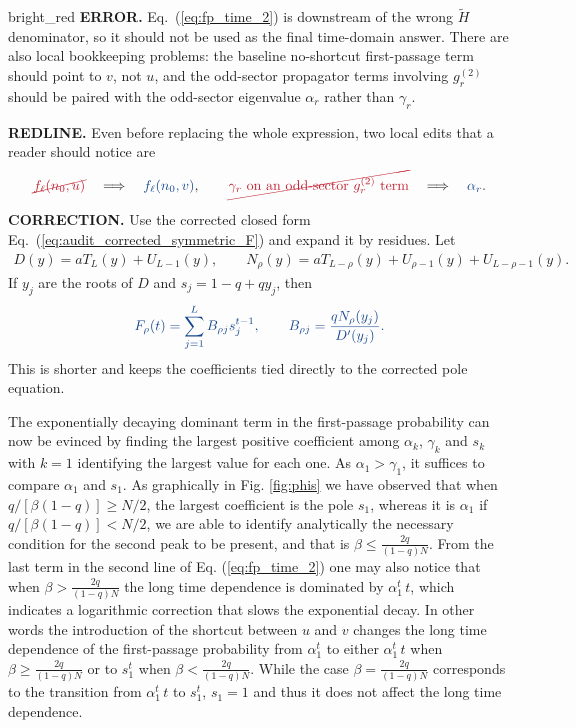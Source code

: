 \documentclass[10pt, hidelinks, superscriptaddress, amsmath, amssymb, aps, pre]{revtex4-2}
\newcommand{\auditlabel}[1]{\textbf{\textcolor{audit_blue}{#1}}}
\newcommand{\auditcorrected}[1]{\textcolor{audit_blue}{#1}}
\newcommand{\auditmathwrong}[1]{\textcolor{bright_red}{\cancel{#1}}}
\newcommand{\auditarrow}{\quad\Longrightarrow\quad}
\begin{document}
\begin{auditbox}{bright_red}
\auditlabel{ERROR.}  Eq.~(\ref{eq:fp_time_2}) is downstream of the wrong
$\widetilde H$ denominator, so it should not be used as the final time-domain
answer.  There are also local bookkeeping problems: the baseline no-shortcut
first-passage term should point to $v$, not $u$, and the odd-sector propagator
terms involving $g^{(2)}_r$ should be paired with the odd-sector eigenvalue
$\alpha_r$ rather than $\gamma_r$.

\auditlabel{REDLINE.}  Even before replacing the whole expression, two local
edits that a reader should notice are
\begin{align}
\auditmathwrong{f_\ell(n_0,u)}
\auditarrow
\auditcorrected{f_\ell(n_0,v)},\qquad
\auditmathwrong{\gamma_r\ \hbox{on an odd-sector }g^{(2)}_r\hbox{ term}}
\auditarrow
\auditcorrected{\alpha_r}.
\label{eq:audit_redline_convolution_local}
\end{align}

\auditlabel{CORRECTION.}  Use the corrected closed form
Eq.~(\ref{eq:audit_corrected_symmetric_F}) and expand it by residues.  Let
\begin{align}
D(y)=aT_L(y)+U_{L-1}(y),\qquad
N_\rho(y)=aT_{L-\rho}(y)+U_{\rho-1}(y)+U_{L-\rho-1}(y).
\end{align}
If $y_j$ are the roots of $D$ and $s_j=1-q+qy_j$, then
\begin{align}
\auditcorrected{
F_\rho(t)=\sum_{j=1}^{L}B_{\rho j}s_j^{t-1},\qquad
B_{\rho j}=\frac{qN_\rho(y_j)}{D'(y_j)}.}
\label{eq:audit_corrected_residue_expansion}
\end{align}
This is shorter and keeps the coefficients tied directly to the corrected pole
equation.
\end{auditbox}
The exponentially decaying dominant term in the first-passage probability can now be evinced by finding the largest positive coefficient among $\alpha_k$, $\gamma_k$ and $s_k$ with $k=1$ identifying the largest value for each one. As $\alpha_1>\gamma_1$, it suffices to compare $\alpha_1$ and $s_1$. As graphically in Fig. \ref{fig:phis} we have observed that when $q/[\beta(1-q)]\geq N/2$, the largest coefficient is the pole $s_1$, whereas it is $\alpha_1$ if $q/[\beta(1-q)]< N/2$, we are able to identify analytically the necessary condition for the second peak to be present, and that is $\beta\leq \frac{2q}{(1-q)N}$. From the last term in the second line of Eq. (\ref{eq:fp_time_2}) one may also notice that when $\beta> \frac{2q}{(1-q)N}$ the long time dependence is dominated by $\alpha_1^t\,t$, which indicates a logarithmic correction that slows the exponential decay. In other words the introduction of the shortcut between $u$ and $v$ changes the long time dependence of the first-passage probability from $\alpha_1^t$ to  either $\alpha_1^t\,t$ when $\beta\geq \frac{2q}{(1-q)N}$ or to $s_1^t$ when $\beta < \frac{2q}{(1-q)N}$. While the case $\beta=\frac{2q}{(1-q)N}$ corresponds to the transition from $\alpha_1^t\,t$ to $s_1^t$, $s_1=1$ and thus it does not affect the long time dependence.
\end{document}
